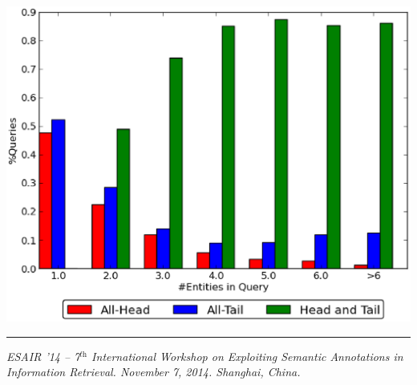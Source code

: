 \documentclass[a0,portrait,final]{a0poster}
\begin{document}
\begin{multicols}{2}
	
		
		\vspace{10mm}
		\begin{center}
		\includegraphics[width=0.7\columnwidth]{img/entity-head-tail-count.eps}
		\label{img:headTailEntPercent}
		\end{center}




\end{multicols}
\vfill
\centering
\begin{minipage}[c]{\textwidth}
\rule{\textwidth}{1pt}
\textit{ESAIR '14  -- 7$^\textit{th}$ International Workshop on Exploiting Semantic Annotations in Information Retrieval. November 7, 2014. Shanghai, China.}
\end{minipage}
\end{document}
